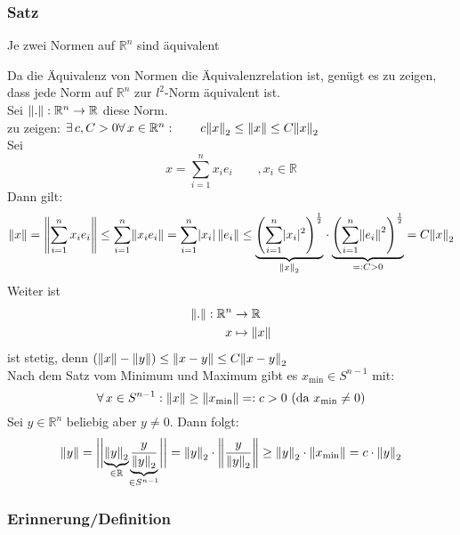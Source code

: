 \subsubsection{Satz} %
\label{ssub:satz}
Je zwei Normen auf $\mathbb{R}^n$ sind äquivalent

Da die Äquivalenz von Normen die Äquivalenzrelation ist, genügt es zu zeigen, dass jede Norm auf $\mathbb{R}^n$ zur $l^2$-Norm äquivalent ist. \\
Sei $\norm{.}:\mathbb{R}^n \to  \mathbb{R}$ diese Norm. \\
zu zeigen: $\exists\, c,C>0 \forall\, x \in \mathbb{R}^n: \qquad c \norm{x}_2 \leq \norm{x} \leq C \norm{x}_2$ \\
Sei \[
	x = \sum^{n}_{i=1}x_ie_i \qquad , x_i \in \mathbb{R}
\]
Dann gilt:
\[
	\norm{x}= \norm{\sum^{n}_{i=1}x_ie_i} \leq \sum^{n}_{i=1}\norm{x_ie_i} = \sum^{n}_{i=1}\abs{x_i} \, \norm{e_i} 
	\leq \underset{\norm{x}_2}{\underbrace{\left(\sum^{n}_{i=1}\abs{x_i}^2  \right)^{\frac{1}{2}}}} \cdot
	 \underset{=:C >0}{\underbrace{\left(\sum^{n}_{i=1}\norm{e_i}^2  \right)^{\frac{1}{2}}}} = C \norm{x}_2
\]
Weiter ist 
\begin{align*}
	\norm{.}:\mathbb{R}^n &\to  \mathbb{R} \\
	x &\mapsto \norm{x}
\end{align*}
ist stetig, denn $(\norm{x}-\norm{y}) \leq \norm{x-y} \leq C \norm{x-y}_2$ \\
Nach dem Satz vom Minimum und Maximum gibt es $x_{\text{min}} \in S^{n-1}$ mit: 
\[
	\forall\, x \in S^{n-1}: \norm{x} \geq \norm{x_\text{min}} =: c>0 \text{ (da $x_{\text{min}}\neq 0$)}
\]
Sei $y \in \mathbb{R}^n$ beliebig aber $y \neq 0$. Dann folgt:
\[
	\norm{y}= \bigg\vert\bigg\vert \underset{\in \mathbb{R}}{\underbrace{\norm{y}_2}} \underset{\in S^{n-1}}{\underbrace{\frac{y}{\norm{y}_2}}} \bigg\vert\bigg\vert  = \norm{y}_2 \cdot
	 \norm{\frac{y}{\norm{y}_2}} \geq \norm{y}_2 \cdot \norm{x_{\text{min}}} = c \cdot \norm{y}_2
	\]
	\bewende


\subsubsection{Erinnerung/Definition} %
\label{ssub:erinnerung_definition}

